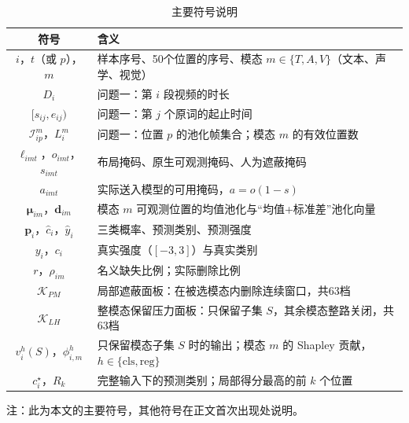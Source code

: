 \begin{table}[htbp]
\centering
\caption{主要符号说明}
\label{tab:symbols}
\begin{tabularx}{\textwidth}{c>{\raggedright\arraybackslash}X}
\toprule
符号 & 含义 \\
\midrule
$i$，$t$（或 $p$），$m$ & 样本序号、50个位置的序号、模态 $m\in\{T,A,V\}$（文本、声学、视觉） \\
$D_i$ & 问题一：第 $i$ 段视频的时长 \\
$[s_{ij},e_{ij})$ & 问题一：第 $j$ 个原词的起止时间 \\
$\mathcal{I}_{ip}^m$，$L_i^m$ & 问题一：位置 $p$ 的池化帧集合；模态 $m$ 的有效位置数 \\
$\ell_{imt}$，$o_{imt}$，$s_{imt}$ & 布局掩码、原生可观测掩码、人为遮蔽掩码 \\
$a_{imt}$ & 实际送入模型的可用掩码，$a=o(1-s)$ \\
$\boldsymbol{\mu}_{im}$，$\boldsymbol{d}_{im}$ & 模态 $m$ 可观测位置的均值池化与“均值+标准差”池化向量 \\
$\boldsymbol{p}_i$，$\hat c_i$，$\hat y_i$ & 三类概率、预测类别、预测强度 \\
$y_i$，$c_i$ & 真实强度（$[-3,3]$）与真实类别 \\
$r$，$\rho_{im}$ & 名义缺失比例；实际删除比例 \\
$\mathcal{K}_{PM}$ & 局部遮蔽面板：在被选模态内删除连续窗口，共63档 \\
$\mathcal{K}_{LH}$ & 整模态保留压力面板：只保留子集 $S$，其余模态整路关闭，共63档 \\
$v_i^h(S)$，$\phi_{i,m}^h$ & 只保留模态子集 $S$ 时的输出；模态 $m$ 的 Shapley 贡献，$h\in\{\mathrm{cls},\mathrm{reg}\}$ \\
$c_i^\star$，$R_k$ & 完整输入下的预测类别；局部得分最高的前 $k$ 个位置 \\
\bottomrule
\end{tabularx}
\end{table}

注：此为本文的主要符号，其他符号在正文首次出现处说明。
